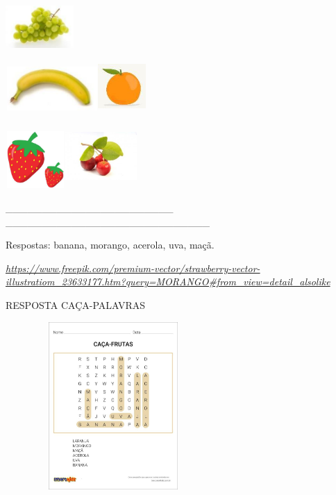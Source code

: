 \begin{escola}
\includegraphics[width=1.02083in,height=0.67986in]{media/image99.jpg}

\includegraphics[width=1.38958in,height=0.65208in]{media/image100.jpg}\includegraphics[width=0.71875in,height=0.71875in]{media/image101.jpg}

\includegraphics[width=0.89097in,height=0.85417in]{media/image102.jpg}\includegraphics[width=1.07847in,height=0.97917in]{media/image103.jpg}

\_\_\_\_\_\_\_\_\_\_\_\_\_\_\_\_\_\_\_\_\_\_\_
\_\_\_\_\_\_\_\_\_\_\_\_\_\_\_\_\_\_\_\_\_\_\_\_\_\_\_\_

Respostas: banana, morango, acerola, uva, maçã.

\href{https://www.freepik.com/premium-vector/strawberry-vector-illustratiom_23633177.htm?query=MORANGO\#from_view=detail_alsolike}{\emph{https://www.freepik.com/premium-vector/strawberry-vector-illustratiom\_23633177.htm?query=MORANGO\#from\_view=detail\_alsolike}}

RESPOSTA CAÇA-PALAVRAS

\includegraphics[width=3.23199in,height=2.51443in]{media/image104.jpg}


\end{escola}
